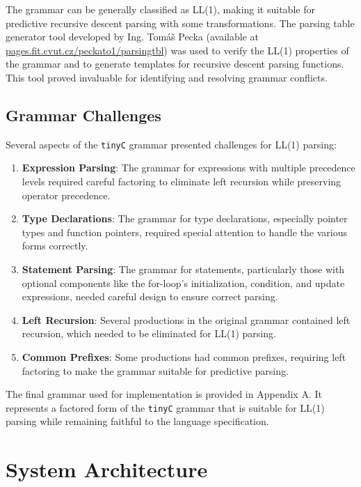 The grammar can be generally classified as LL(1), making it suitable for predictive recursive descent parsing with some transformations. The parsing table generator tool developed by Ing. Tomáš Pecka (available at \url{pages.fit.cvut.cz/peckato1/parsingtbl}) was used to verify the LL(1) properties of the grammar and to generate templates for recursive descent parsing functions. This tool proved invaluable for identifying and resolving grammar conflicts.

\subsection{Grammar Challenges}

Several aspects of the \texttt{tinyC} grammar presented challenges for LL(1) parsing:

\begin{enumerate}
    \item \textbf{Expression Parsing}: The grammar for expressions with multiple precedence levels required careful factoring to eliminate left recursion while preserving operator precedence.

    \item \textbf{Type Declarations}: The grammar for type declarations, especially pointer types and function pointers, required special attention to handle the various forms correctly.

    \item \textbf{Statement Parsing}: The grammar for statements, particularly those with optional components like the for-loop's initialization, condition, and update expressions, needed careful design to ensure correct parsing.

    \item \textbf{Left Recursion}: Several productions in the original grammar contained left recursion, which needed to be eliminated for LL(1) parsing.

    \item \textbf{Common Prefixes}: Some productions had common prefixes, requiring left factoring to make the grammar suitable for predictive parsing.
\end{enumerate}

The final grammar used for implementation is provided in Appendix A. It represents a factored form of the \texttt{tinyC} grammar that is suitable for LL(1) parsing while remaining faithful to the language specification.

\section{System Architecture}

